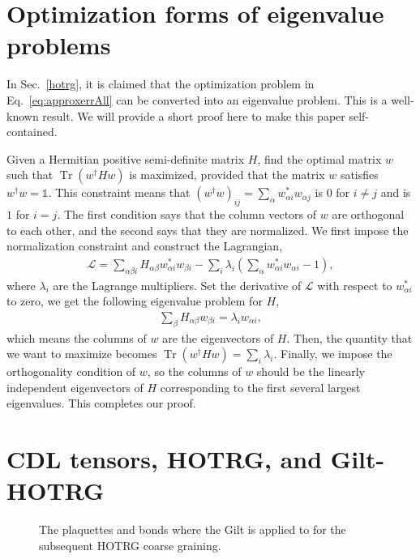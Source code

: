 \documentclass[aps,prb,reprint,superscriptaddress,floatfix]{revtex4-2}
\DeclareMathOperator{\Tr}{Tr}
\begin{document}
\appendix
\section{Optimization forms of eigenvalue problems\label{appd:opteig}}
In Sec.~\ref{hotrg}, it is claimed that the optimization problem in
Eq.~\eqref{eq:approxerrAll} can be converted into an eigenvalue problem.
This is a well-known result. We will provide a short proof here to make
this paper self-contained. 
%

Given a Hermitian positive semi-definite matrix $H$, find the optimal
matrix $w$ such that $\Tr{(w^{\dagger} H w)}$ is maximized, provided that
the matrix $w$ satisfies $w^{\dagger}w = \mathbb{1}$. This constraint
means that $(w^{\dagger}w)_{ij} = \sum_{\alpha} w^*_{\alpha i} w_{\alpha
j}$ is $0$ for $i\neq j$ and is $1$ for $i = j$. The first condition
says that the column vectors of $w$ are orthogonal to each other, and the
second says that they are normalized. We first impose the normalization
constraint and construct the Lagrangian,
%
\begin{align}\label{eq:langMult}
    \mathcal{L} = \sum_{\alpha \beta i} H_{\alpha\beta} w^*_{\alpha i}
    w_{\beta i} - \sum_i \lambda _i \left(\sum_{\alpha}w^*_{\alpha i}
        w_{\alpha i} - 1\right),
\end{align}
%
where $\lambda_i$ are the Lagrange multipliers. Set the derivative of
$\mathcal{L}$ with respect to $w^*_{\alpha i}$ to zero, we get the
following eigenvalue problem for $H$,
%
\begin{align}\label{eq:eigenProblem}
    \sum_{\beta} H_{\alpha\beta} w_{\beta i} = \lambda_i w_{\alpha i},
\end{align}
%
which means the columns of $w$ are the eigenvectors of $H$. Then, the
quantity that we want to maximize becomes $\Tr{(w^{\dagger}Hw)} = \sum_i
\lambda_i$. Finally, we impose the orthogonality condition of $w$, so
the columns of $w$ should be the linearly independent eigenvectors of
$H$ corresponding to the first several largest eigenvalues. This
completes our proof.
%

\section{CDL tensors, HOTRG, and Gilt-HOTRG\label{appd:cdlHOTRG}}
%
\begin{figure}[!t]
\caption{\label{fig:gilt4hotrg}The plaquettes and bonds where the
Gilt is applied to for the subsequent HOTRG coarse graining.} 
\end{figure}
%
\end{document}
